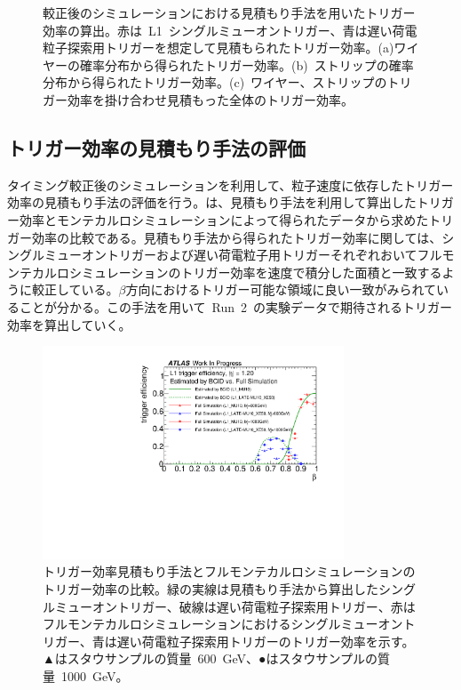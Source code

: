 \begin{figure}[H]
\begin{minipage}{0.99\hsize}
    \subcaption{}
    \end{minipage}
    \caption[較正後のシミュレーションにおける見積もり手法を用いたトリガー効率の算出]{較正後のシミュレーションにおける見積もり手法を用いたトリガー効率の算出。赤は~L1~シングルミューオントリガー、青は遅い荷電粒子探索用トリガーを想定して見積もられたトリガー効率。(a)ワイヤーの確率分布から得られたトリガー効率。(b)~ストリップの確率分布から得られたトリガー効率。(c)~ワイヤー、ストリップのトリガー効率を掛け合わせ見積もった全体のトリガー効率。}\label{fig:efftune}
\end{figure}


\subsection{トリガー効率の見積もり手法の評価}\label{chap:caltri}
タイミング較正後のシミュレーションを利用して、粒子速度に依存したトリガー効率の見積もり手法の評価を行う。は、見積もり手法を利用して算出したトリガー効率とモンテカルロシミュレーションによって得られたデータから求めたトリガー効率の比較である。見積もり手法から得られたトリガー効率に関しては、シングルミューオントリガーおよび遅い荷電粒子用トリガーそれぞれおいてフルモンテカルロシミュレーションのトリガー効率を速度で積分した面積と一致するように較正している。$\beta$方向におけるトリガー可能な領域に良い一致がみられていることが分かる。この手法を用いて~Run~2~の実験データで期待されるトリガー効率を算出していく。

\begin{figure}[H]
    \centering   
    \includegraphics[width=0.8\textwidth,page=1]{img/rec/vs.pdf}
    \caption[トリガー効率見積もり手法とフルモンテカルロシミュレーションのトリガー効率の比較]{トリガー効率見積もり手法とフルモンテカルロシミュレーションのトリガー効率の比較。緑の実線は見積もり手法から算出したシングルミューオントリガー、破線は遅い荷電粒子探索用トリガー、赤はフルモンテカルロシミュレーションにおけるシングルミューオントリガー、青は遅い荷電粒子探索用トリガーのトリガー効率を示す。▲はスタウサンプルの質量~600~GeV、●はスタウサンプルの質量~1000~GeV。}\label{fig:comp}
\end{figure}

